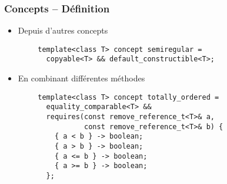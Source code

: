 \documentclass[C++.tex]{subfiles}
\begin{document}
\begin{frame}[fragile]
	\frametitle{Concepts -- Définition}
	\begin{itemize}
		\item Depuis d'autres concepts
	\end{itemize}

	\begin{verbatim}
		template<class T> concept semiregular =
		  copyable<T> && default_constructible<T>;
  	\end{verbatim}

	\begin{itemize}
		\item En combinant différentes méthodes
	\end{itemize}

	\begin{verbatim}
		template<class T> concept totally_ordered =
		  equality_comparable<T> &&
		  requires(const remove_reference_t<T>& a,
		           const remove_reference_t<T>& b) {
		    { a < b } -> boolean;
		    { a > b } -> boolean;
		    { a <= b } -> boolean;
		    { a >= b } -> boolean;
		  };
	\end{verbatim}

\end{frame}
\end{document}
